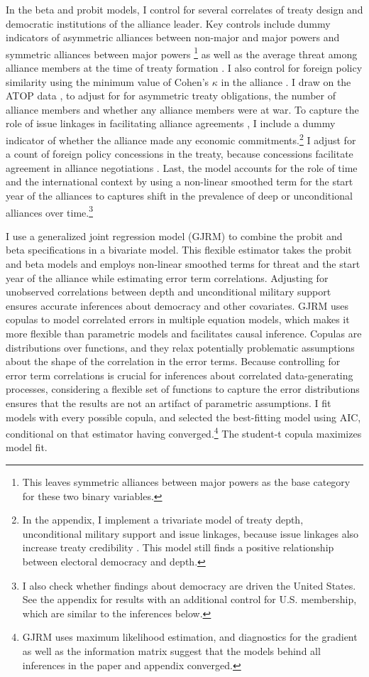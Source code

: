 \documentclass[12pt]{article}
\begin{document}
In the beta and probit models, I control for several correlates of treaty design and democratic institutions of the alliance leader. 
Key controls include dummy indicators of asymmetric alliances between non-major and major powers and symmetric alliances between major powers \citep{Mattes2012}\footnote{This leaves symmetric alliances between major powers as the base category for these two binary variables.} as well as the average threat among alliance members at the time of treaty formation \citep{LeedsSavun2007}. 
I also control for foreign policy similarity using the minimum value of Cohen's $\kappa$ in the alliance \citep{Hage2011}.
I draw on the ATOP data \citep{Leedsetal2002}, to adjust for for asymmetric treaty obligations, the number of alliance members and whether any alliance members were at war. 
To capture the role of issue linkages in facilitating alliance agreements \citep{Poast2012}, I include a dummy indicator of whether the alliance made any economic commitments.\footnote{In the appendix, I implement a trivariate model of treaty depth, unconditional military support and issue linkages, because issue linkages also increase treaty credibility \citep{ Poast2013}. This model still finds a positive relationship between electoral democracy and depth.}  
I adjust for a count of foreign policy concessions in the treaty, because concessions facilitate agreement in alliance negotiations \citep{Johnson2015}. 
Last, the model accounts for the role of time and the international context by using a non-linear smoothed term for the start year of the alliances to captures shift in the prevalence of deep or unconditional alliances over time.\footnote{I also check whether findings about democracy are driven the United States. See the appendix for results with an additional control for U.S. membership, which are similar to the inferences below.}


I use a generalized joint regression model (GJRM) \citep{Braumoelleretal2018} to combine the probit and beta specifications in a bivariate model.
This flexible estimator takes the probit and beta models and employs non-linear smoothed terms for threat and the start year of the alliance while estimating error term correlations. 
Adjusting for unobserved correlations between depth and unconditional military support ensures accurate inferences about democracy and other covariates.
GJRM uses copulas to model correlated errors in multiple equation models, which makes it more flexible than parametric models and facilitates causal inference. 
Copulas are distributions over functions, and they relax potentially problematic assumptions about the shape of the correlation in the error terms. 
Because controlling for error term correlations is crucial for inferences about correlated data-generating processes, considering a flexible set of functions to capture the error distributions ensures that the results are not an artifact of parametric assumptions. 
I fit models with every possible copula, and selected the best-fitting model using AIC, conditional on that estimator having converged.\footnote{GJRM uses maximum likelihood estimation, and diagnostics for the gradient as well as the information matrix suggest that the models behind all inferences in the paper and appendix converged.} 
The student-t copula maximizes model fit. 
\end{document}
